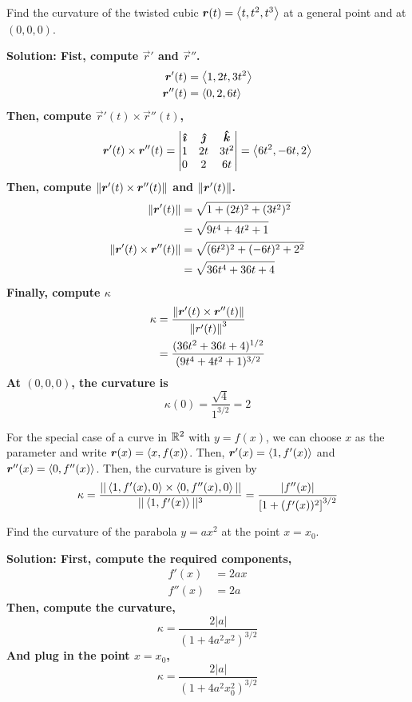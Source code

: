 \begin{example}
    Find the curvature of the twisted cubic \(\boldsymbol{r}(t) = \left\langle t, t^2, t^3\right\rangle\) at a general point and at \((0,0,0)\).\par\bf{Solution: }Fist, compute \(\vec r'\) and \(\vec r''\).
    \begin{align*}
        \boldsymbol{r}'(t) &= \left\langle1, 2t, 3t^2\right\rangle \\
        \boldsymbol{r}''(t) &= \left\langle0, 2, 6t\right\rangle
    \end{align*}
    Then, compute \(\vec r'(t)\times \vec r''(t)\),
    \[\boldsymbol{r}'(t)\times \boldsymbol{r}''(t) = \begin{vmatrix}
        \boldsymbol{\hat{\imath}} & \boldsymbol{\hat{\jmath}} & \boldsymbol{\hat{k}} \\
        1 & 2t & 3t^2 \\
        0 & 2 & 6t
    \end{vmatrix} = \left\langle6t^2, -6t, 2\right\rangle \]
    Then, compute \(\norm{\boldsymbol{r}'(t)\times \boldsymbol{r}''(t)}\) and \(\norm{\boldsymbol{r}'(t)}\).
    \begin{align*}
        \norm{\boldsymbol{r}'(t)} &= \sqrt{1+(2t)^2+(3t^2)^2} \\
        &= \sqrt{9t^4+4t^2+1} \\
        \norm{\boldsymbol{r}'(t)\times \boldsymbol{r}''(t)} &= \sqrt{(6t^2)^2+(-6t)^2+2^2} \\
        &= \sqrt{36t^4+36t+4}
    \end{align*}
    Finally, compute \(\kappa\)
    \begin{align*}
        \kappa &= \frac{\norm{\boldsymbol{r}'(t)\times \boldsymbol{r}''(t)}}{\norm{r'(t)}^3} \\
        &= \frac{(36t^2+36t+4)^{1/2}}{(9t^4+4t^2+1)^{3/2}}
    \end{align*}
    At \((0,0,0)\), the curvature is 
    \[ \kappa(0) = \frac{\sqrt 4}{1^{3/2}} = 2\]
\end{example}
For the special case of a curve in \(\mathbb{R}^2\) with \(y=f(x)\), we can choose \(x\) as the parameter and write \(\boldsymbol{r}(x) = \left\langle x, f(x) \right\rangle\). Then, \(\boldsymbol{r}'(x) = \left\langle 1, f'(x) \right\rangle\) and \(\boldsymbol{r}''(x) = \left\langle 0, f''(x) \right\rangle\). Then, the curvature is given by
\[ \kappa = \frac{||\<1, f'(x), 0\> \times \< 0, f''(x), 0\> ||}{||\< 1, f'(x)\>||^3} = \frac{|f''(x)|}{\bqty{1+(f'(x))^2}^{3/2}}\]
\begin{example}
    Find the curvature of the parabola \(y=ax^2\) at the point \(x=x_0\).\par\bf{Solution: } First, compute the required components,
    \begin{align*}
        f'(x) &= 2ax \\
        f''(x) &= 2a
    \end{align*}
    Then, compute the curvature,
    \[ \kappa = \frac{2|a|}{(1+4a^2x^2)^{3/2}}\]
    And plug in the point \(x = x_0\),
    \[ \kappa = \frac{2|a|}{(1+4a^2x_0^2)^{3/2}}\]
\end{example}
